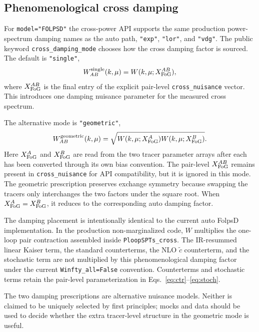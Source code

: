 \documentclass[11pt]{article}
\begin{document}
\subsection{Phenomenological cross damping}
\label{sec:cross-damping}

For \texttt{model="FOLPSD"} the cross-power API supports the same production
power-spectrum damping names as the auto path, \texttt{"exp"}, \texttt{"lor"},
and \texttt{"vdg"}.  The public keyword
\texttt{cross\_damping\_mode} chooses how the cross damping factor is sourced.
The default is \texttt{"single"},
\begin{equation}
W_{AB}^{\mathrm{single}}(k,\mu)
=
W(k,\mu;X_{\rm FoG}^{AB}),
\end{equation}
where $X_{\rm FoG}^{AB}$ is the final entry of the explicit pair-level
\texttt{cross\_nuisance} vector.  This introduces one damping nuisance
parameter for the measured cross spectrum.

The alternative mode is \texttt{"geometric"},
\begin{equation}
W_{AB}^{\mathrm{geometric}}(k,\mu)
=
\sqrt{
W(k,\mu;X_{\rm FoG}^{A})
W(k,\mu;X_{\rm FoG}^{B})
}.
\end{equation}
Here $X_{\rm FoG}^{A}$ and $X_{\rm FoG}^{B}$ are read from the two tracer
parameter arrays after each has been converted through its own bias convention.
The pair-level $X_{\rm FoG}^{AB}$ remains present in
\texttt{cross\_nuisance} for API compatibility, but it is ignored in this mode.
The geometric prescription preserves exchange symmetry because swapping the
tracers only interchanges the two factors under the square root.  When
$X_{\rm FoG}^{A}=X_{\rm FoG}^{B}$, it reduces to the corresponding auto damping
factor.

The damping placement is intentionally identical to the current auto FolpsD
implementation.  In the production non-marginalized code, $W$ multiplies the
one-loop pair contraction assembled inside \texttt{PloopSPTs\_cross}.  The
IR-resummed linear Kaiser term, the standard counterterms, the NLO
$\widetilde c$ counterterm, and the stochastic term are not multiplied by this
phenomenological damping factor under the current \texttt{Winfty\_all=False}
convention.  Counterterms and stochastic terms retain the pair-level
parameterization in Eqs.~\eqref{eq:ctr}--\eqref{eq:stoch}.

The two damping prescriptions are alternative nuisance models.  Neither is
claimed to be uniquely selected by first principles; mocks and data should be
used to decide whether the extra tracer-level structure in the geometric mode
is useful.
\end{document}
